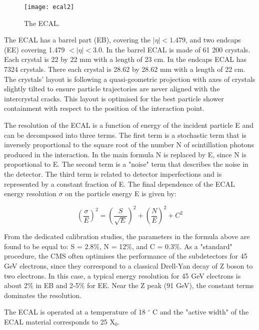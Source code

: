 \begin{normalsize}
\begin{figure}[H]
  \centering
  \texttt{[image: ecal2]}
  \caption[The ECAL]{The ECAL.}
  \label{ecal2}
\end{figure}

The ECAL has a barrel part (EB), covering the $|\eta|< 1.479$, and two endcaps (EE) covering 1.479 $< |\eta |  < 3.0$.
In the barrel ECAL is made of 61 200 crystals. Each crystal is 22 by 22 mm with a length of 23 cm. In the endcaps ECAL has 7324 crystals. There each crystal is 28.62 by 28.62 mm with a length of 22 cm. The crystals' layout is following a quasi-geometric projection with axes of crystals slightly tilted to ensure particle trajectories are never aligned with the intercrystal cracks. This layout is optimised for the best particle shower containment with respect to the position of the interaction point.  


The resolution of the ECAL is a function of energy of the incident particle E and can be decomposed into three terms. The first term is a stochastic term that is inversely proportional to the square root of the number N of scintillation photons produced in the interaction. In the main formula N is replaced by E, since N is proportional to E. The second term is a "noise" term that describes the noise in the detector.  The third term is related to detector imperfections and is represented by a constant fraction of E. The final dependence of the ECAL energy resolution $\sigma$ on the particle energy E is given by:

  
\begin{equation}
  \left(\frac{\sigma}{E}\right)^2 = \left(\frac{S}{\sqrt{E}}\right)^2 +
  \left(\frac{N}{E}\right)^2 + C^2
  \label{eq:ecal}
\end{equation}

From the dedicated calibration studies, the parameters in the formula above are found to be equal to: S = 2.8$\%$, N = 12$\%$, and C = 0.3$\%$. As a "standard" procedure, the CMS often optimises the performance of the subdetectors for 45 GeV electrons, since they correspond to a classical Drell-Yan decay of Z boson to two electrons. In this case, a typical energy resolution for 45 GeV electrons is about 2$\%$ in EB and 2-5$\%$ for EE. Near the Z peak (91 GeV), the constant terms dominates the resolution.


The ECAL is operated at a temperature of 18 $^{\circ}$ C and the "active width" of the ECAL material corresponds to 25 X$_0$. 


\end{normalsize}
